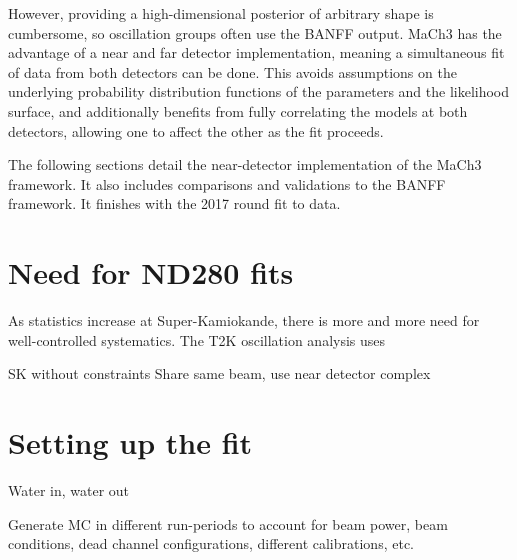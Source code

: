 However, providing a high-dimensional posterior of arbitrary shape is cumbersome, so oscillation groups often use the BANFF output. MaCh3 has the advantage of a near and far detector implementation, meaning a simultaneous fit of data from both detectors can be done. This avoids assumptions on the underlying probability distribution functions of the parameters and the likelihood surface, and additionally benefits from fully correlating the models at both detectors, allowing one to affect the other as the fit proceeds.

The following sections detail the near-detector implementation of the MaCh3 framework. It also includes comparisons and validations to the BANFF framework. It finishes with the 2017 round fit to data.

\section{Need for ND280 fits}
As statistics increase at Super-Kamiokande, there is more and more need for well-controlled systematics. The T2K oscillation analysis uses 

SK without constraints
Share same beam, use near detector complex

\section{Setting up the fit}

Water in, water out

Generate MC in different run-periods to account for beam power, beam conditions, dead channel configurations, different calibrations, etc.


